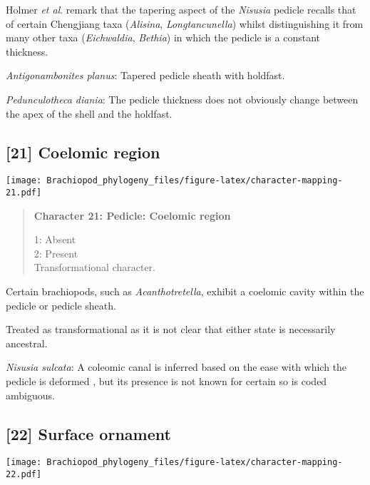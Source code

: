 \documentclass[openany]{book}
\theoremstyle{definition}
\theoremstyle{definition}
\theoremstyle{definition}
\theoremstyle{remark}
\begin{document}
Holmer \emph{et al}. \citeyearpar{Holmer2018Theattachment} remark that
the tapering aspect of the \emph{Nisusia} pedicle recalls that of
certain Chengjiang taxa (\emph{Alisina}, \emph{Longtancunella}) whilst
distinguishing it from many other taxa (\emph{Eichwaldia},
\emph{Bethia}) in which the pedicle is a constant thickness.

\hypertarget{Antigonambonites_planus-coding-20}{}
\emph{Antigonambonites planus}: Tapered pedicle sheath with holdfast.

\hypertarget{Pedunculotheca_diania-coding-20}{}
\emph{Pedunculotheca diania}: The pedicle thickness does not obviously
change between the apex of the shell and the holdfast.

\subsection*{{[}21{]} Coelomic region}\label{coelomic-region}

\texttt{[image: Brachiopod\_phylogeny\_files/figure-latex/character-mapping-21.pdf]}

\begin{quote}
\textbf{Character 21: Pedicle: Coelomic region}

1: Absent\\
2: Present\\
Transformational character.
\end{quote}

Certain brachiopods, such as \emph{Acanthotretella}, exhibit a coelomic
cavity within the pedicle or pedicle sheath.

Treated as transformational as it is not clear that either state is
necessarily ancestral.

\hypertarget{Nisusia_sulcata-coding-21}{}
\emph{Nisusia sulcata}: A coleomic canal is inferred based on the ease
with which the pedicle is deformed
\citep{Holmer2018Evolutionarysignificance}, but its presence is not
known for certain so is coded ambiguous.

\subsection*{{[}22{]} Surface ornament}\label{surface-ornament-1}

\texttt{[image: Brachiopod\_phylogeny\_files/figure-latex/character-mapping-22.pdf]}
\end{document}
